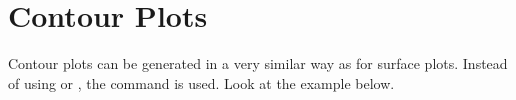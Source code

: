 %
%
%
%
%
%
%
%
%
%

\section{Contour Plots}

Contour plots can be generated in a very similar way as for surface
plots.  Instead of using  or ,
the command  is used.  Look at the example below.


